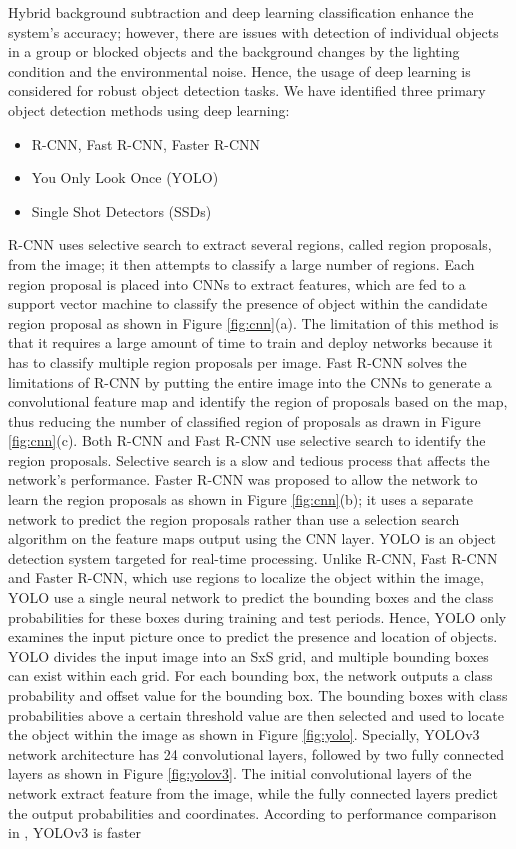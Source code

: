 Hybrid background subtraction and deep learning classification enhance the system’s accuracy; however, there are issues with detection of individual objects in a group or blocked objects and the background changes by the lighting condition and the environmental noise. Hence, the usage of deep learning is considered for robust object detection tasks. We have identified three primary object detection methods using deep learning:
\begin{itemize}
\item R-CNN, Fast R-CNN, Faster R-CNN
\item You Only Look Once (YOLO)
\item Single Shot Detectors (SSDs) 
\end{itemize}
R-CNN \cite{girshick2014rich} uses selective search \cite{uijlings2013selective} to extract several regions, called region proposals, from the image; it then attempts to classify a large number of regions. Each region proposal is placed into CNNs to extract features, which are fed to a support vector machine to classify the presence of object within the candidate region proposal as shown in Figure \ref{fig:cnn}(a). The limitation of this method is that it requires a large amount of time to train and deploy networks because it has to classify multiple region proposals per image. Fast R-CNN \cite{girshick2015fast} solves the limitations of R-CNN by putting the entire image into the CNNs to generate a convolutional feature map and identify the region of proposals based on the map, thus reducing the number of classified region of proposals as drawn in Figure \ref{fig:cnn}(c). Both R-CNN and Fast R-CNN use selective search to identify the region proposals. Selective search is a slow and tedious process that affects the network’s performance. Faster R-CNN \cite{ren2015faster} was proposed to allow the network to learn the region proposals as shown in Figure \ref{fig:cnn}(b); it uses a separate network to predict the region proposals rather than use a selection search algorithm on the feature maps output using the CNN layer. YOLO \cite{redmon2016you} is an object detection system targeted for real-time processing. Unlike R-CNN, Fast R-CNN and Faster R-CNN, which use regions to localize the object within the image, YOLO use a single neural network to predict the bounding boxes and the class probabilities for these boxes during training and test periods. Hence, YOLO only examines the input picture once to predict the presence and location of objects. YOLO divides the input image into an SxS grid, and multiple bounding boxes can exist within each grid. For each bounding box, the network outputs a class probability and offset value for the bounding box. The bounding boxes with class probabilities above a certain threshold value are then selected and used to locate the object within the image as shown in Figure \ref{fig:yolo}. Specially, YOLOv3 network architecture has 24 convolutional layers, followed by two fully connected layers as shown in Figure \ref{fig:yolov3}. The initial convolutional layers of the network extract feature from the image, while the fully connected layers predict the output probabilities and coordinates. According to performance comparison in \cite{redmon2018yolov3}, YOLOv3 is faster 